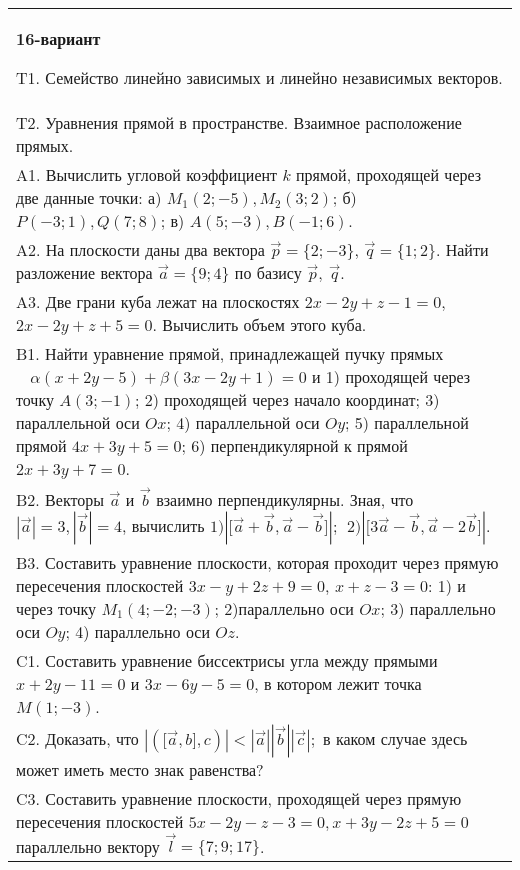 \documentclass{article}
\begin{document}
\begin{tabular}{m{17cm}}
\textbf{16-вариант}
\newline

T1. 
Семейство линейно зависимых и линейно независимых векторов.
 \\
T2. 
Уравнения прямой в пространстве. Взаимное расположение прямых.
 \\
A1. 
Вычислить угловой коэффициент \(k\) прямой, проходящей через две данные точки: а) \(M_{1}(2; - 5),M_{2}(3;2)\); б) \(P( - 3;1),Q(7;8)\); в) \(A(5; - 3),B( - 1;6)\).
 \\
A2. 
На плоскости даны два вектора \(\overrightarrow{p} = \{ 2; - 3\}\), \(\overrightarrow{q} = \{ 1;2\}\). Найти разложение вектора \(\overrightarrow{a} = \{ 9;4\}\) по базису \(\overrightarrow{p},\ \overrightarrow{q}\).
 \\
A3. 
Две грани куба лежат на плоскостях \(2x - 2y + z - 1 = 0,\) \(2x - 2y + z + 5 = 0\). Вычислить объем этого куба.
 \\
B1. 
Найти уравнение прямой, принадлежащей пучку прямых \(\ \ \ \ \alpha(x + 2y - 5) + \beta(3x - 2y + 1) = 0\) и 1) проходящей через точку \(A(3; - 1)\); 2) проходящей через начало координат; 3) параллельной оси \(Ox\); 4) параллельной оси \(Oy\); 5) параллельной прямой \(4x + 3y + 5 = 0\); 6) перпендикулярной к прямой \(2x + 3y + 7 = 0\).
 \\
B2. 
Векторы \(\overrightarrow{a}\) и \(\overrightarrow{b}\) взаимно перпендикулярны. Зная, что \(|\overrightarrow{a}| = 3,|\overrightarrow{b}| = 4\), вычислить \(1)|\lbrack\overrightarrow{a} + \overrightarrow{b},\overrightarrow{a} - \overrightarrow{b}\rbrack|;\ \ 2)|\lbrack 3\overrightarrow{a} - \overrightarrow{b},\overrightarrow{a} - 2\overrightarrow{b}\rbrack|\).
 \\
B3. 
Составить уравнение плоскости, которая проходит через прямую пересечения плоскостей \(3x - y + 2z + 9 = 0\), \(x + z - 3 = 0\): 1) и через точку \(M_{1}(4; - 2; - 3)\); 2)параллельно оси \(Ox\); 3) параллельно оси \(Oy\); 4) параллельно оси \(Oz\).
 \\
C1. 
Составить уравнение биссектрисы угла между прямыми \(x + 2y - 11 = 0\) и \(3x - 6y - 5 = 0\), в котором лежит точка \(M(1; - 3)\).
 \\
C2. 
Доказать, что \(|(\lbrack\overrightarrow{a},b\rbrack,c)| <  |\overrightarrow{a}||\overrightarrow{b}||\overrightarrow{c}|;\) в каком случае здесь может иметь место знак равенства?
 \\
C3. 
Составить уравнение плоскости, проходящей через прямую пересечения плоскостей \(5x - 2y - z - 3 = 0,x + 3y - 2z + 5 = 0\) параллельно вектору \(\overrightarrow{l} = \{ 7;9;17\}\).
 \\

\end{tabular}
\vspace{1cm}
\end{document}

